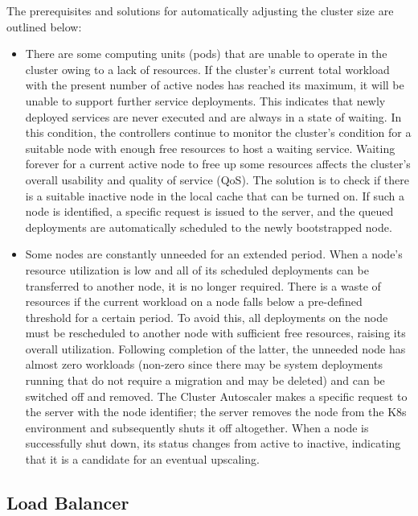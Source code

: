 The prerequisites and solutions for automatically adjusting the cluster size are
outlined below:
\begin{itemize}
  \item There are some computing units (pods) that are unable to operate in the cluster
    owing to a lack of resources.
    \newline
    If the cluster's current total workload with the present number of active
    nodes has reached its maximum, it will be unable to support further service deployments.
    This indicates that newly deployed services are never executed and are
    always in a state of waiting. In this condition, the controllers continue to
    monitor the cluster's condition for a suitable node with enough free
    resources to host a waiting service. Waiting forever for a current active node
    to free up some resources affects the cluster's overall usability and quality
    of service (QoS). The solution is to check if there is a suitable inactive
    node in the local cache that can be turned on. If such a node is identified,
    a specific request is issued to the server, and the queued deployments are automatically
    scheduled to the newly bootstrapped node.

  \item Some nodes are constantly unneeded for an extended period. When a node's
    resource utilization is low and all of its scheduled deployments can be
    transferred to another node, it is no longer required.
    \newline
    There is a waste of resources if the current workload on a node falls below
    a pre-defined threshold for a certain period. To avoid this, all deployments
    on the node must be rescheduled to another node with sufficient free
    resources, raising its overall utilization. Following completion of the
    latter, the unneeded node has almost zero workloads (non-zero since there
    may be system deployments running that do not require a migration and may be
    deleted) and can be switched off and removed. The Cluster Autoscaler makes a
    specific request to the server with the node identifier; the server removes the
    node from the K8s environment and subsequently shuts it off altogether. When
    a node is successfully shut down, its status changes from active to inactive,
    indicating that it is a candidate for an eventual upscaling.
\end{itemize}

\subsection{Load Balancer}
\label{subsec:architecture_components_load_balancer}

